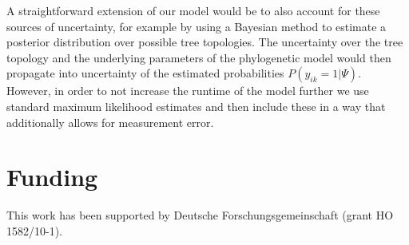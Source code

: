 \documentclass{bioinfo}
\begin{document}
A straightforward extension of our model would be to also account for these sources of uncertainty, for example by using a Bayesian method to estimate a posterior distribution over possible tree topologies. The uncertainty over the tree topology and the underlying parameters of the phylogenetic model would then propagate into uncertainty of the estimated probabilities \(P(y_{ik}=1|\Psi)\). However, in order to not increase the runtime of the model further we use standard maximum likelihood estimates and then include these in a way that additionally allows for measurement error.

%
%











\section*{Funding}

This work has been supported by Deutsche Forschungsgemeinschaft (grant HO 1582/10-1).\vspace*{-12pt}


%
%
%
%
%
%
%

\end{document}
